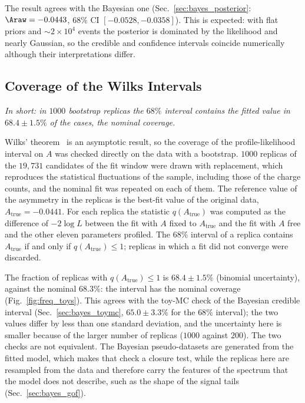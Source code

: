 The result agrees with the Bayesian one (Sec.~\ref{sec:bayes_posterior}: $\Araw=-0.0443$, $68\%$ CI $[-0.0528,-0.0358]$). This is expected: with flat priors and $\sim2\times10^4$ events the posterior is dominated by the likelihood and nearly Gaussian, so the credible and confidence intervals coincide numerically although their interpretations differ.

\subsection{Coverage of the Wilks Intervals}
\label{sec:freq_coverage}
\emph{In short: in $1000$ bootstrap replicas the $68\%$ interval contains the fitted value in $68.4\pm1.5\%$ of the cases, the nominal coverage.}

Wilks' theorem~\cite{wilks} is an asymptotic result, so the coverage of the profile-likelihood interval on $A$ was checked directly on the data with a bootstrap. $1000$ replicas of the $19{,}731$ candidates of the fit window were drawn with replacement, which reproduces the statistical fluctuations of the sample, including those of the charge counts, and the nominal fit was repeated on each of them. The reference value of the asymmetry in the replicas is the best-fit value of the original data, $A_{\mathrm{true}}=-0.0441$. For each replica the statistic $q(A_{\mathrm{true}})$ was computed as the difference of $-2\log L$ between the fit with $A$ fixed to $A_{\mathrm{true}}$ and the fit with $A$ free and the other eleven parameters profiled. The $68\%$ interval of a replica contains $A_{\mathrm{true}}$ if and only if $q(A_{\mathrm{true}})\leq1$; replicas in which a fit did not converge were discarded.

The fraction of replicas with $q(A_{\mathrm{true}})\leq1$ is $68.4\pm1.5\%$ (binomial uncertainty), against the nominal $68.3\%$: the interval has the nominal coverage (Fig.~\ref{fig:freq_toys}). This agrees with the toy-MC check of the Bayesian credible interval (Sec.~\ref{sec:bayes_toymc}, $65.0\pm3.3\%$ for the $68\%$ interval); the two values differ by less than one standard deviation, and the uncertainty here is smaller because of the larger number of replicas ($1000$ against $200$). The two checks are not equivalent. The Bayesian pseudo-datasets are generated from the fitted model, which makes that check a closure test, while the replicas here are resampled from the data and therefore carry the features of the spectrum that the model does not describe, such as the shape of the signal tails (Sec.~\ref{sec:bayes_gof}). %

